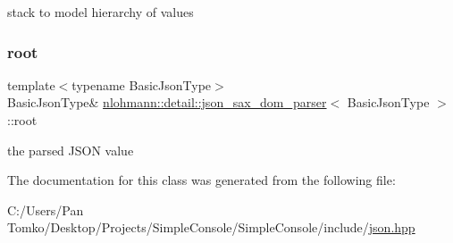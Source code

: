 stack to model hierarchy of values 

\mbox{\label{classnlohmann_1_1detail_1_1json__sax__dom__parser_aef0477277389e399d7128898841b71c0}} 
\subsubsection{\texorpdfstring{root}{root}}
{\footnotesize\ttfamily template$<$typename Basic\+Json\+Type$>$ \\
Basic\+Json\+Type\& \mbox{\hyperlink{classnlohmann_1_1detail_1_1json__sax__dom__parser}{nlohmann\+::detail\+::json\+\_\+sax\+\_\+dom\+\_\+parser}}$<$ Basic\+Json\+Type $>$\+::root\hspace{0.3cm}{\ttfamily [private]}}



the parsed J\+S\+ON value 



The documentation for this class was generated from the following file\+:\begin{DoxyCompactItemize}
\item 
C\+:/\+Users/\+Pan Tomko/\+Desktop/\+Projects/\+Simple\+Console/\+Simple\+Console/include/\mbox{\hyperlink{json_8hpp}{json.\+hpp}}\end{DoxyCompactItemize}
